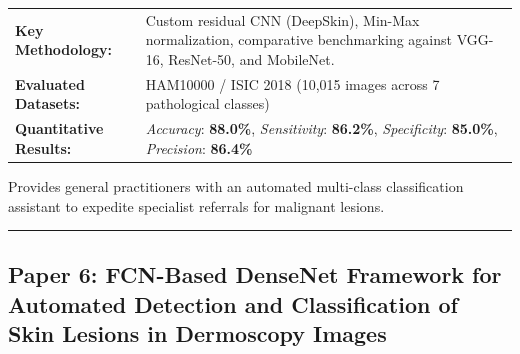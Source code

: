 \documentclass[10pt,a4paper]{article}
\begin{document}
\vspace{4pt}
\begin{tabularx}{\linewidth}{p{3.2cm}X}
\toprule
\textbf{Key Methodology:} & Custom residual CNN (DeepSkin), Min-Max normalization, comparative benchmarking against VGG-16, ResNet-50, and MobileNet. \\
\textbf{Evaluated Datasets:} & HAM10000 / ISIC 2018 (10,015 images across 7 pathological classes) \\
\textbf{Quantitative Results:} & \textit{Accuracy}: \textbf{88.0\%}, \textit{Sensitivity}: \textbf{86.2\%}, \textit{Specificity}: \textbf{85.0\%}, \textit{Precision}: \textbf{86.4\%} \\
\bottomrule
\end{tabularx}
\vspace{4pt}
\begin{tcolorbox}[utilitybox,title=Clinical Utility and Real-World Impact]
Provides general practitioners with an automated multi-class classification assistant to expedite specialist referrals for malignant lesions.
\end{tcolorbox}
\vspace{12pt}
\hrule
\vspace{12pt}
\subsection*{Paper 6: FCN-Based DenseNet Framework for Automated Detection and Classification of Skin Lesions in Dermoscopy Images}
\end{document}
